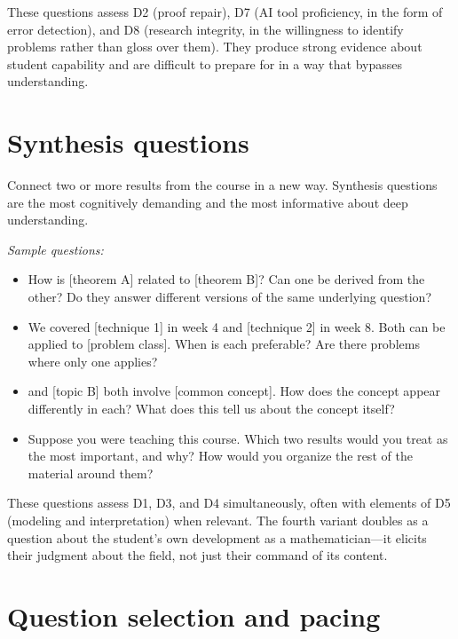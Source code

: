 \documentclass[11pt]{book}
\begin{document}
These questions assess D2 (proof repair), D7 (AI tool proficiency, in the form of error detection), and D8 (research integrity, in the willingness to identify problems rather than gloss over them). They produce strong evidence about student capability and are difficult to prepare for in a way that bypasses understanding.

\section{Synthesis questions}

Connect two or more results from the course in a new way. Synthesis questions are the most cognitively demanding and the most informative about deep understanding.

\textit{Sample questions:}

\begin{itemize}\setlength{\itemsep}{2pt}
\item How is [theorem A] related to [theorem B]? Can one be derived from the other? Do they answer different versions of the same underlying question?
\item We covered [technique 1] in week 4 and [technique 2] in week 8. Both can be applied to [problem class]. When is each preferable? Are there problems where only one applies?
\item [Topic A] and [topic B] both involve [common concept]. How does the concept appear differently in each? What does this tell us about the concept itself?
\item Suppose you were teaching this course. Which two results would you treat as the most important, and why? How would you organize the rest of the material around them?
\end{itemize}

These questions assess D1, D3, and D4 simultaneously, often with elements of D5 (modeling and interpretation) when relevant. The fourth variant doubles as a question about the student's own development as a mathematician---it elicits their judgment about the field, not just their command of its content.

\section{Question selection and pacing}
\end{document}
